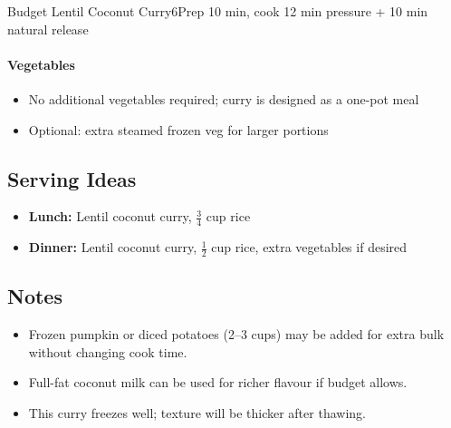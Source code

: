 \begin{recipebox}{Budget Lentil Coconut Curry}{6}{Prep 10 min, cook 12 min pressure + 10 min natural release}
\paragraph{Vegetables}
\begin{itemize}
    \item No additional vegetables required; curry is designed as a one-pot meal
    \item Optional: extra steamed frozen veg for larger portions
\end{itemize}

\subsection*{Serving Ideas}
\begin{itemize}
    \item \textbf{Lunch:} Lentil coconut curry, $\tfrac{3}{4}$ cup rice
    \item \textbf{Dinner:} Lentil coconut curry, $\tfrac{1}{2}$ cup rice, extra vegetables if desired
\end{itemize}

\subsection*{Notes}
\begin{itemize}
    \item Frozen pumpkin or diced potatoes (2--3 cups) may be added for extra bulk without changing cook time.
    \item Full-fat coconut milk can be used for richer flavour if budget allows.
    \item This curry freezes well; texture will be thicker after thawing.
\end{itemize}
\end{recipebox}
